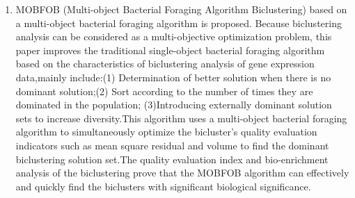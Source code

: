 \begin{eabstract}
\begin{enumerate}
    \item { MOBFOB (Multi-object Bacterial Foraging Algorithm Biclustering) based on a multi-object bacterial foraging algorithm is proposed. Because biclustering analysis can be considered as a multi-objective optimization problem, this paper improves the traditional single-object bacterial foraging algorithm based on the characteristics of biclustering analysis of gene expression data,mainly include:(1)  Determination of better solution when there is no dominant solution;(2) Sort according to the number of times they are dominated in the population; (3)Introducing externally dominant solution sets to increase diversity.This algorithm uses a multi-object bacterial foraging algorithm to simultaneously optimize the bicluster's quality evaluation indicators such as mean square residual and volume to find the dominant biclustering solution set.The quality evaluation index and bio-enrichment analysis of the biclustering prove that the MOBFOB algorithm can effectively and quickly find the biclusters with significant biological significance.}
  \end{enumerate}


\end{eabstract}